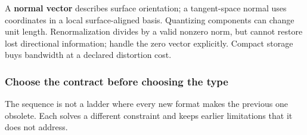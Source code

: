 A \textbf{normal vector} describes surface orientation; a tangent-space normal uses coordinates in a local surface-aligned basis. Quantizing components can change unit length. Renormalization divides by a valid nonzero norm, but cannot restore lost directional information; handle the zero vector explicitly. Compact storage buys bandwidth at a declared distortion cost.

\subsubsection{Choose the contract before choosing the type}\label{01-foundations-i-ch001-choose-the-contract-before-choosing-the-type}

\hypertarget{01-foundations-i-ch001-choose-the-contract-before-choosing-the-type}{}

The sequence is not a ladder where every new format makes the previous one obsolete. Each solves a different constraint and keeps earlier limitations that it does not address.

